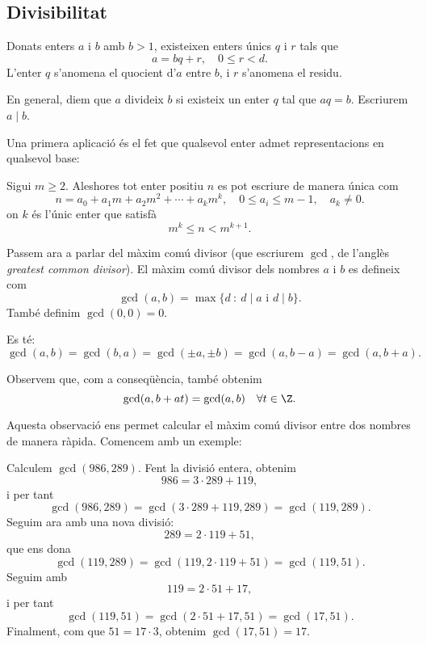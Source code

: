 \subsection{Divisibilitat}
\begin{theorem}
Donats enters $a$ i $b$ amb $b > 1$, existeixen enters únics $q$ i $r$ tals que
\[
a = bq +r,\quad 0\leq r < d.
\]
L'enter $q$ s'anomena el quocient d'$a$ entre $b$, i $r$ s'anomena el residu.
\end{theorem}
En general, diem que $a$ divideix $b$ si existeix un enter $q$ tal que $aq=b$. Escriurem $a\mid b$.

Una primera aplicació és el fet que qualsevol enter admet representacions en qualsevol base:
\begin{theorem}
Sigui $m\geq 2$. Aleshores tot enter positiu $n$ es pot escriure de manera única com
\[
n = a_0 + a_1 m+a_2m^2+\cdots+ a_km^k, \quad 0\leq a_i\leq m-1,\quad a_k\neq 0.
\]
on $k$ és l'únic enter que satisfà
\[
m^k \leq n < m^{k+1}.
\]
\end{theorem}

Passem ara a parlar del màxim comú divisor (que escriurem $\gcd$, de l'anglès \emph{greatest common divisor}). El màxim comú divisor dels nombres $a$ i $b$ es defineix com
\[
\gcd(a,b)=\max\{d ~\colon~ d\mid a\text{ i } d\mid b\}.
\]
També definim $\gcd(0,0)=0$.

\begin{lemma}
Es té:
\[
\gcd(a,b) = \gcd(b,a)=\gcd(\pm a,\pm b) = \gcd(a,b-a) = \gcd(a,b+a). 
\]
\end{lemma}

Observem que, com a conseqüència, també obtenim
\[
\gcd(a,b+at) = \gcd(a,b)\quad \forall t\in\Z.
\]

Aquesta observació ens permet calcular el màxim comú divisor entre dos nombres de manera ràpida. Comencem amb un exemple:

\begin{example}
Calculem $\gcd(986,289)$. Fent la divisió entera, obtenim
\[
986 = 3\cdot 289 + 119,
\]
i per tant
\[
\gcd(986,289) = \gcd(3\cdot 289+119,289) = \gcd(119,289).
\]
Seguim ara amb una nova divisió:
\[
289 = 2\cdot 119 + 51,
\]
que ens dona
\[
\gcd(119,289) = \gcd(119,2\cdot 119 + 51) = \gcd(119, 51).
\]
Seguim amb
\[
119 = 2\cdot 51 + 17,
\]
i per tant
\[
\gcd(119,51) = \gcd(2\cdot 51+ 17,51) = \gcd(17,51).
\]
Finalment, com que $51=17\cdot 3$, obtenim $\gcd(17,51) = 17$.
\end{example}

